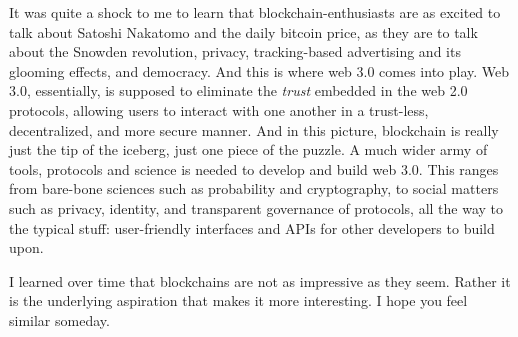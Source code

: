 It was quite a shock to me to learn that blockchain-enthusiasts are as excited to talk about Satoshi
Nakatomo and the daily bitcoin price, as they are to talk about the Snowden revolution, privacy,
tracking-based advertising and its glooming effects, and democracy. And this is where web 3.0 comes
into play. Web 3.0, essentially, is supposed to eliminate the \textit{trust} embedded in the web 2.0
protocols, allowing users to interact with one another in a trust-less, decentralized, and more
secure manner. And in this picture, blockchain is really just the tip of the iceberg, just one piece
of the puzzle. A much wider army of tools, protocols and science is needed to develop and build web
3.0. This ranges from bare-bone sciences such as probability and cryptography, to social matters
such as privacy, identity, and transparent governance of protocols, all the way to the typical
stuff: user-friendly interfaces and APIs for other developers to build upon.

I learned over time that blockchains are not as impressive as they seem. Rather it is the underlying
aspiration that makes it more interesting. I hope you feel similar someday.
